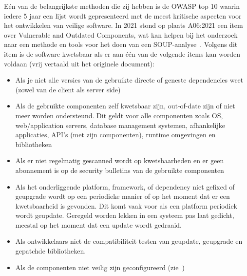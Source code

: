 Eén van de belangrijkste methoden die zij hebben is de OWASP top 10 waarin iedere 5 jaar een lijst wordt gepresenteerd met de meest kritische aspecten voor het ontwikkelen van veilige software. In 2021 stond op plaats A06:2021 een item over Vulnerable and Outdated Components, wat kan helpen bij het onderzoek naar een methode en tools voor het doen van een SOUP-analyse~\citep{OWASP:2021}.
Volgens dit item is de software kwetsbaar als er aan één van de volgende items kan worden voldaan (vrij vertaald uit het originele document):
\begin{itemize}
    \item Als je niet alle versies van de gebruikte directe of geneste dependencies weet (zowel van de client als server side)
    \item Als de gebruikte componenten zelf kwetsbaar zijn, out-of-date zijn of niet meer worden ondersteund. Dit geldt voor alle componenten zoals OS, web/application servers, database management systemen, afhankelijke applicaties, API's (met zijn componenten), runtime omgevingen en bibliotheken
    \item Als er niet regelmatig gescanned wordt op kwetsbaarheden en er geen abonnement is op de security bulletins van de gebruikte componenten
    \item Als het onderliggende platform, framework, of dependency niet gefixed of geupgrade wordt op een periodieke manier of op het moment dat er een kwetsbaarheid is gevonden. Dit komt vaak voor als een platform periodiek wordt geupdate. Geregeld worden lekken in een systeem pas laat gedicht, meestal op het moment dat een update wordt gedraaid.
    \item Als ontwikkelaars niet de compatibiliteit testen van geupdate, geupgrade en gepatchde bibliotheken.
    \item Als de componenten niet veilig zijn geconfigureerd (zie~\citep{OWASP:2021})
\end{itemize}

